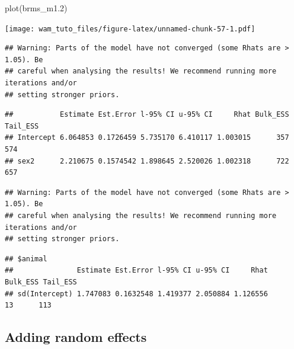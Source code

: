 \documentclass[
  12pt,
]{book}
\newenvironment{Shaded}{\begin{snugshade}}{\end{snugshade}}
\newcommand{\FloatTok}[1]{\textcolor[rgb]{0.00,0.00,0.81}{#1}}
\newcommand{\FunctionTok}[1]{\textcolor[rgb]{0.00,0.00,0.00}{#1}}
\newcommand{\NormalTok}[1]{#1}
\newcommand{\SpecialCharTok}[1]{\textcolor[rgb]{0.00,0.00,0.00}{#1}}
\begin{document}
\begin{Shaded}
\begin{Highlighting}[]
\FunctionTok{plot}\NormalTok{(brms\_m1}\FloatTok{.2}\NormalTok{)}
\end{Highlighting}
\end{Shaded}

\texttt{[image: wam\_tuto\_files/figure-latex/unnamed-chunk-57-1.pdf]}

\begin{Shaded}
\end{Shaded}

\begin{verbatim}
## Warning: Parts of the model have not converged (some Rhats are > 1.05). Be
## careful when analysing the results! We recommend running more iterations and/or
## setting stronger priors.
\end{verbatim}

\begin{verbatim}
##           Estimate Est.Error l-95% CI u-95% CI     Rhat Bulk_ESS Tail_ESS
## Intercept 6.064853 0.1726459 5.735170 6.410117 1.003015      357      574
## sex2      2.210675 0.1574542 1.898645 2.520026 1.002318      722      657
\end{verbatim}

\begin{Shaded}
\end{Shaded}

\begin{verbatim}
## Warning: Parts of the model have not converged (some Rhats are > 1.05). Be
## careful when analysing the results! We recommend running more iterations and/or
## setting stronger priors.
\end{verbatim}

\begin{verbatim}
## $animal
##               Estimate Est.Error l-95% CI u-95% CI     Rhat Bulk_ESS Tail_ESS
## sd(Intercept) 1.747083 0.1632548 1.419377 2.050884 1.126556       13      113
\end{verbatim}

\hypertarget{adding-random-effects-2}{%
\subsection{Adding random effects}\label{adding-random-effects-2}}
\end{document}
